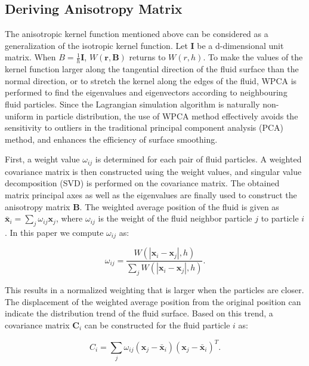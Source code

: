 \documentclass[times,twocolumn,final]{elsarticle}
\begin{document}
\subsection{Deriving Anisotropy Matrix}
The anisotropic kernel function mentioned above can be considered as a generalization of the isotropic kernel function. Let $\mathbf{I}$ be a d-dimensional unit matrix. When $B=\frac 1 h \mathbf{I}$, $W(\mathbf{r},\mathbf{B})$ returns to $W(r,h)$. To make the values of the kernel function larger along the tangential direction of the fluid surface than the normal direction, or to stretch the kernel along the edges of the fluid, WPCA\cite{ref:ref30} is performed to find the eigenvalues and eigenvectors according to neighbouring fluid particles. Since the Lagrangian simulation algorithm is naturally non-uniform in particle distribution, the use of WPCA method effectively avoids the sensitivity to outliers in the traditional principal component analysis (PCA) method, and enhances the efficiency of surface smoothing.

First, a weight value $\omega_{ij}$ is determined for each pair of fluid particles. A weighted covariance matrix is then constructed using the weight values, and singular value decomposition (SVD) is performed on the covariance matrix. The obtained matrix principal axes as well as the eigenvalues are finally used to construct the anisotropy matrix $\mathbf{B}$. The weighted average position of the fluid is given as $\bar{\mathbf{x}}_{i}=\sum_{j} \omega_{ij} \mathbf{x}_{j}$, where $\omega_{ij}$ is the weight of the fluid neighbor particle $j$ to particle $i$. In this paper we 
compute $\omega_{i j}$ as:

\begin{equation}
\omega_{i j}=\frac{W\left(\left|\mathbf{x}_{i}-\mathbf{x}_{j}\right|, h\right)}{\sum_{j} W\left(\left|\mathbf{x}_{i}-\mathbf{x}_{j}\right|, h\right)}.\label{con:equa11}
\end{equation}

This results in a normalized weighting that is larger when the particles are closer. The displacement of the weighted average position from the original position can indicate the distribution trend of the fluid surface. Based on this trend, a covariance matrix $\mathbf{C}_i$ can be constructed for the fluid particle $i$ as:

\begin{equation}
C_{i}=\sum_{j} \omega_{i j}\left(\mathbf{x}_{j}-\bar{\mathbf{x}}_{i}\right)\left(\mathbf{x}_{j}-\bar{\mathbf{x}}_{i}\right)^{T}\label{con:equa12}.
\end{equation}
\end{document}

